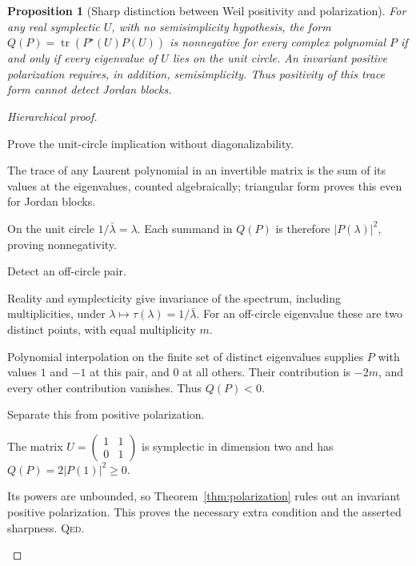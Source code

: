 \documentclass[11pt,a4paper]{article}
\newtheorem{proposition}[definition]{Proposition}
\theoremstyle{remark}\newtheorem{remark}[definition]{Remark}
\newcommand{\tr}{\operatorname{tr}}\newcommand{\im}{\operatorname{im}}
\newcommand{\QED}{\textsc{Qed}}
\begin{document}
\begin{proposition}[Sharp distinction between Weil positivity and polarization]\label{prop:weil-converse}
For any real symplectic $U$, with no semisimplicity hypothesis, the form
$Q(P)=\tr(P^\star(U)P(U))$ is nonnegative for every complex polynomial $P$ if and only if every eigenvalue of $U$ lies on the unit circle. An invariant positive polarization requires, in addition, semisimplicity. Thus positivity of this trace form cannot detect Jordan blocks.
\end{proposition}
\begin{proof}[Hierarchical proof]
\begin{steps}
\item Prove the unit-circle implication without diagonalizability.
\begin{steps}
\item The trace of any Laurent polynomial in an invertible matrix is the sum of its values at the eigenvalues, counted algebraically; triangular form proves this even for Jordan blocks.
\item On the unit circle $1/\bar\lambda=\lambda$. Each summand in $Q(P)$ is therefore $|P(\lambda)|^2$, proving nonnegativity.
\end{steps}
\item Detect an off-circle pair.
\begin{steps}
\item Reality and symplecticity give invariance of the spectrum, including multiplicities, under $\lambda\mapsto\tau(\lambda)=1/\bar\lambda$. For an off-circle eigenvalue these are two distinct points, with equal multiplicity $m$.
\item Polynomial interpolation on the finite set of distinct eigenvalues supplies $P$ with values $1$ and $-1$ at this pair, and $0$ at all others. Their contribution is $-2m$, and every other contribution vanishes. Thus $Q(P)<0$.
\end{steps}
\item Separate this from positive polarization.
\begin{steps}
\item The matrix $U=\left(\begin{smallmatrix}1&1\\0&1\end{smallmatrix}\right)$ is symplectic in dimension two and has $Q(P)=2|P(1)|^2\ge0$.
\item Its powers are unbounded, so Theorem~\ref{thm:polarization} rules out an invariant positive polarization. This proves the necessary extra condition and the asserted sharpness. \QED.
\end{steps}
\end{steps}
\end{proof}
\end{document}
